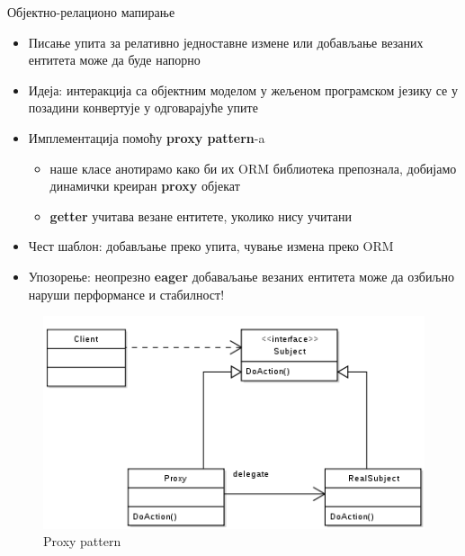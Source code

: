 \documentclass{beamer}
\begin{document}
    \begin{frame}[allowframebreaks]{Објектно-релационо мапирање}
        \begin{itemize}
            \item Писање упита за релативно једноставне измене или добављање везаних ентитета може да буде напорно
            \item Идеја: интеракција са објектним моделом у жељеном програмском језику се у позадини конвертује у одговарајуће упите
            \item Имплементација помоћу \textbf{proxy pattern}-a
            \begin{itemize}
                \item наше класе анотирамо како би их ORM библиотека препознала, добијамо динамички креиран \textbf{proxy} објекат
                \item \textbf{getter} учитава везане ентитете, уколико нису учитани
            \end{itemize}
            \item Чест шаблон: добављање преко упита, чување измена преко ORM
            \item Упозорење: неопрезно \textbf{eager} добаваљање везаних ентитета може да озбиљно наруши перформансе и стабилност!          
        \end{itemize}
        
        \framebreak
        
        \begin{figure}
            \centering
            \includegraphics[width=\textwidth,height=0.7\textheight,keepaspectratio]{images/proxy.png}
            \caption{Proxy pattern}
            \label{fig:proxy}
        \end{figure}
        
        \framebreak
        

\end{frame}
\end{document}
